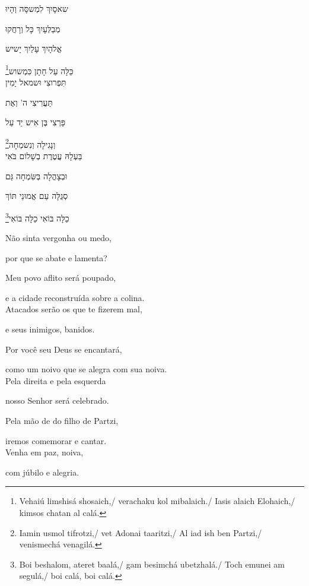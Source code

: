 שאסָיִךְ לִמְשסָּה וְהָיוּ

מְבַלְּעָיִךְ כָּל וְרָחֲקוּ

אֱלהָיִךְ עָלַיִךְ יָשיש

\footnote{Vehaiú limshisá shosaich,/ verachaku kol mibalaich./ Iasis alaich Elohaich,/ kimsos chatan al calá.}כַּלָּה עַל חָתָן כִּמְשוש\\[10pt]

תִּפְרוצִי וּשמאל יָמִין

תַּעֲרִיצִי ה' וְאֶת

פַּרְצִי בֶּן אִיש יַד עַל 

\footnote{Iamin usmol tifrotzi,/ vet Adonai taaritzi,/ Al iad ish ben Partzi,/ venismechá venagilá.}וְנָגִילָה וְנִשמְחָה\\[10pt]


בַּעְלָהּ עֲטֶרֶת בְשָׁלוֹם בֹּאִי

וּבְצָהֳלָה בְּשִּׂמְחָה גַּם 

סְגֻלָּה עַם אֱמוּנֵי תּוֹךְ 

\footnote{Boi beshalom, ateret baalá,/ gam besimchá ubetzhalá./ Toch emunei am segulá,/ boi calá, boi calá.}כַלָּה בּוֹאִי כַלָּה בּוֹאִי

\movetooddpage
\raggedright %

\vspace*{1cm}



Não sinta vergonha ou medo,

por que se abate e lamenta?

Meu povo aflito será poupado,

e a cidade reconstruída sobre a colina.\\[10pt]

Atacados serão os que te fizerem mal,

e seus inimigos, banidos.

Por você seu Deus se encantará,

como um noivo que se alegra com sua noiva.\\[10pt]

Pela direita e pela esquerda

nosso Senhor será celebrado.

Pela mão de do filho de Partzi,

iremos comemorar e cantar.\\[10pt]

Venha em paz, noiva,

com júbilo e alegria.

